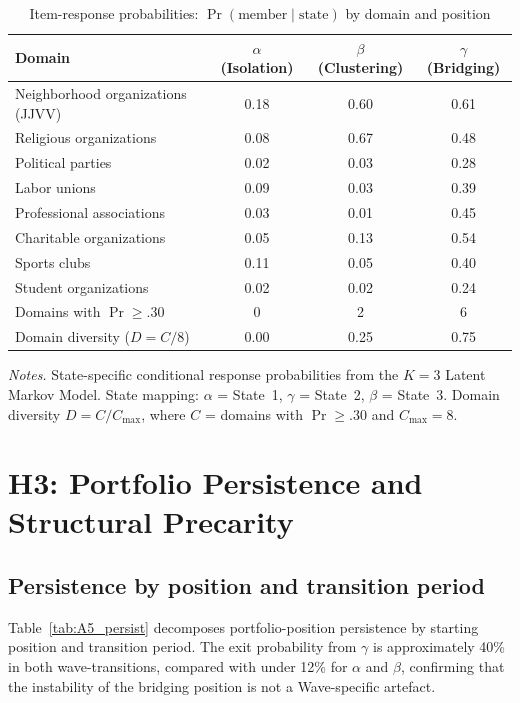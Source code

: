 \documentclass[12pt, a4paper]{article}
\newcommand{\tablenote}[1]{\vspace{4pt}\par\footnotesize\textit{Notes.} #1}
\begin{document}
\begin{table}[H]
\centering
\caption{Item-response probabilities: $\Pr(\text{member} \mid \text{state})$ by domain and position}
\label{tab:A4_profiles}
\small
\begin{tabular}{lccc}
\hline\hline
  Domain & $\alpha$ (Isolation) & $\beta$ (Clustering) & $\gamma$ (Bridging) \\
\hline
  Neighborhood organizations (JJVV) & 0.18 & 0.60 & 0.61 \\
  Religious organizations            & 0.08 & 0.67 & 0.48 \\
  Political parties                  & 0.02 & 0.03 & 0.28 \\
  Labor unions                       & 0.09 & 0.03 & 0.39 \\
  Professional associations          & 0.03 & 0.01 & 0.45 \\
  Charitable organizations           & 0.05 & 0.13 & 0.54 \\
  Sports clubs                       & 0.11 & 0.05 & 0.40 \\
  Student organizations              & 0.02 & 0.02 & 0.24 \\
\hline
  Domains with $\Pr \geq .30$       & 0    & 2    & 6    \\
  Domain diversity ($D = C/8$)      & 0.00 & 0.25 & 0.75 \\
\hline\hline
\end{tabular}
\tablenote{State-specific conditional response probabilities from the $K = 3$
Latent Markov Model. State mapping: $\alpha$ = State~1, $\gamma$ = State~2,
$\beta$ = State~3. Domain diversity $D = C/C_{\max}$, where $C$ = domains
with $\Pr \geq .30$ and $C_{\max} = 8$.}
\end{table}

\section{H3: Portfolio Persistence and Structural Precarity}
\label{sec:h3}

\subsection{Persistence by position and transition period}

Table~\ref{tab:A5_persist} decomposes portfolio-position persistence by starting
position and transition period. The exit probability from $\gamma$ is
approximately 40\% in both wave-transitions, compared with under 12\% for
$\alpha$ and $\beta$, confirming that the instability of the bridging
position is not a Wave-specific artefact.
\end{document}

